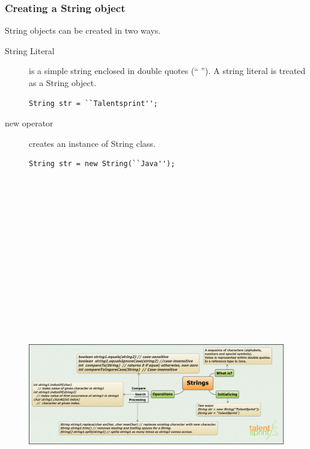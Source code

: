 \documentclass[11pt,a4paper]{article}
\begin{document}
\subsubsection*{Creating a String object}
String objects can be created in two ways.
\begin{description}
\item [String Literal]

is a simple string enclosed in double quotes (`` ''). A string literal is treated as a String object.
 \begin{lstlisting}[numbers=none]
String str = ``Talentsprint'';
\end{lstlisting}

\item [new operator] creates an instance of String class.

 \begin{lstlisting}[numbers=none]
String str = new String(``Java'');
\end{lstlisting}

\end{description}
\begin{figure}[H]
 \begin{center}
   \includegraphics[angle=90,height=19cm, width=12cm]{Strings_Basics.png}
  
 \end{center}
 \end{figure}
\end{document}

